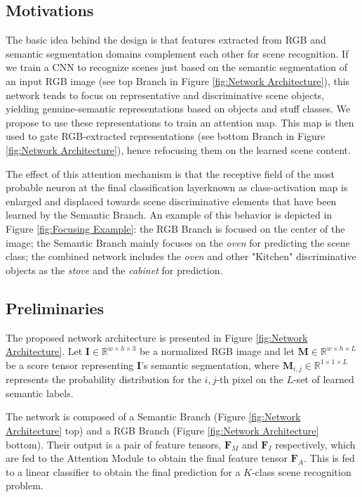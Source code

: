 \documentclass[review, 3p, sort&compress]{elsarticle}
\begin{document}
\subsection{Motivations}
The basic idea behind the design is that features extracted from RGB and semantic segmentation domains complement each other for scene recognition. If we train a CNN to recognize scenes just based on the semantic segmentation of an input RGB image (see top Branch in Figure \ref{fig:Network Architecture}), this network tends to focus on representative and discriminative scene objects, yielding genuine-semantic representations based on objects and stuff classes. We propose to use these representations to train an attention map. This map is then used to gate RGB-extracted representations (see bottom Branch in Figure \ref{fig:Network Architecture}), hence refocusing them on the learned scene content.

The effect of this attention mechanism is that the receptive field of the most probable neuron at the final classification layer\textemdash known as class-activation map \cite{zhou2015cnnlocalization}\textemdash is enlarged and displaced towards scene discriminative elements that have been learned by the Semantic Branch. An example of this behavior is depicted in Figure \ref{fig:Focusing Example}: the RGB Branch is focused on the center of the image; the Semantic Branch mainly focuses on the \textit{oven} for predicting the scene class; the combined network includes the \textit{oven} and other "Kitchen" discriminative objects as the \textit{stove} and the \textit{cabinet} for prediction.

\subsection{Preliminaries} \label{subsec:Network Architecture}
The proposed network architecture is presented in Figure \ref{fig:Network Architecture}. Let \(\textbf{I} \in \mathbb{R}^{w \times h \times 3}\) be a normalized RGB image and let \(\textbf{M} \in \mathbb{R}^{w \times h \times L}\) be a score tensor representing \(\textbf{I}\)'s semantic segmentation, where \(\textbf{M}_{i,j} \in \mathbb{R}^{1 \times 1 \times L}\) represents the probability distribution for the \(i,j\)-th pixel on the \(L\)-set of learned semantic labels. 

The network is composed of a Semantic Branch (Figure \ref{fig:Network Architecture} top) and a RGB Branch (Figure \ref{fig:Network Architecture} bottom). Their output is a pair of feature tensors, \(\textbf{F}_M\) and \(\textbf{F}_I\) respectively, which are fed to the Attention Module to obtain the final feature tensor \(\textbf{F}_A\). This is fed to a linear classifier to obtain the final prediction for a \(K\)-class scene recognition problem.
\end{document}
